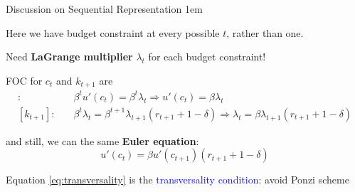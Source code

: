 \documentclass[11pt,aspectratio=43,usenames,dvipsnames]{beamer}
\newcommand{\blue}[1]{\textcolor{blue}{#1}}
\let\olditemize=\itemize
\let\endolditemize=\enditemize
\renewenvironment{itemize}{\olditemize \itemsep1em}{\endolditemize}
\theoremstyle{definition}
\begin{document}
\begin{frame}{Discussion on Sequential Representation}
\label{slide:Discussion_on_Sequential_Representation}
    \begin{itemize}
        \item Here we have budget constraint at every possible $ t $, rather than one.
        \item Need \textbf{LaGrange multiplier} $ \lambda_{t} $ for each budget constraint!
        \item FOC for $ c_{t} $ and $ k_{t+1} $ are
            \begin{align*}
                [c_{t}]: \quad
                    &\beta^{t} u'(c_t) = \beta^{t} \lambda_{t} \Rightarrow u'(c_{t}) = \beta \lambda_{t}
                \\
                [k_{t+1}]: \quad
                    & \beta^{t} \lambda_{t} = \beta^{t+1} \lambda_{t+1} (r_{t+1} + 1 - \delta)
                    \Rightarrow \lambda_{t} = \beta \lambda_{t+1} (r_{t+1} + 1 - \delta)
            \end{align*}
        \item and still, we can the same \textbf{Euler equation}:
        \begin{equation*}
                u'(c_{t}) = \beta u'(c_{t+1}) (r_{t+1} + 1 - \delta)
        \end{equation*}
        \item Equation \eqref{eq:transversality} is the \blue{transversality condition}: avoid Ponzi scheme
    \end{itemize}

\end{frame}
\end{document}
